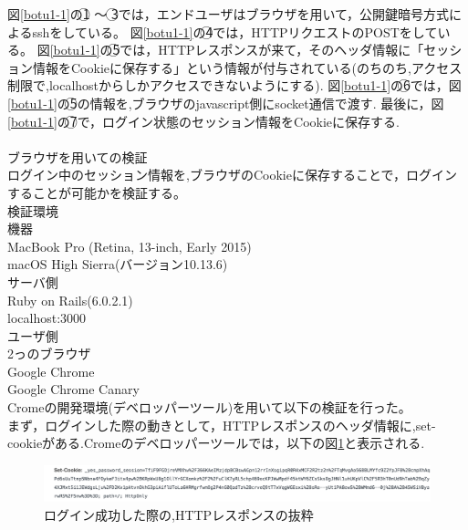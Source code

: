\noindent 図\ref{botu1-1}の\textcircled{\scriptsize 1} 〜 \textcircled{\scriptsize 3}では，エンドユーザはブラウザを用いて，公開鍵暗号方式によるsshをしている。
図\ref{botu1-1}の\textcircled{\scriptsize 4}では，HTTPリクエストのPOSTをしている。
図\ref{botu1-1}の\textcircled{\scriptsize 5}では，HTTPレスポンスが来て，そのヘッダ情報に「セッション情報をCookieに保存する」という情報が付与されている(のちのち,アクセス制限で,localhostからしかアクセスできないようにする).
図\ref{botu1-1}の\textcircled{\scriptsize 6}では，図\ref{botu1-1}の\textcircled{\scriptsize 5}の情報を,ブラウザのjavascript側にsocket通信で渡す.
最後に，図\ref{botu1-1}の\textcircled{\scriptsize 7}で，ログイン状態のセッション情報をCookieに保存する.
\\\\
\noindent ブラウザを用いての検証\\
ログイン中のセッション情報を,ブラウザのCookieに保存することで，ログインすることが可能かを検証する。\\
検証環境\\
 \quad 機器\\
  \qquad MacBook Pro (Retina, 13-inch, Early 2015)\\
  \qquad macOS High Sierra(バージョン10.13.6)\\
 \quad サーバ側\\
 \qquad Ruby on Rails(6.0.2.1)\\
 \qquad localhost:3000\\
 \quad ユーザ側\\
 \qquad 2っのブラウザ\\
 \qquad \quad Google Chrome\\
 \qquad \quad Google Chrome Canary\\
Cromeの開発環境(デベロッパーツール)を用いて以下の検証を行った。\\
まず，ログインした際の動きとして，HTTPレスポンスのヘッダ情報に,set-cookieがある.Cromeのデベロッパーツールでは，以下の図\ref{login-1}と表示される.\\
 \begin{figure}[h]
    \includegraphics[width=13cm]{fig/chapter3/login-1.png}
    \caption{ログイン成功した際の,HTTPレスポンスの抜粋} 
    \label{login-1}
\end{figure}

